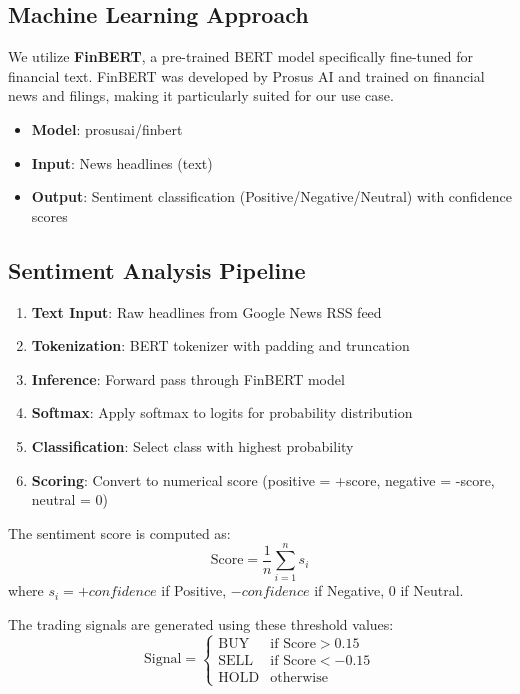 \documentclass[12pt]{article}
\begin{document}
\subsection{Machine Learning Approach}

We utilize \textbf{FinBERT}, a pre-trained BERT model specifically fine-tuned for financial text. FinBERT was developed by Prosus AI and trained on financial news and filings, making it particularly suited for our use case.

\begin{itemize}
\item \textbf{Model}: prosusai/finbert
\item \textbf{Input}: News headlines (text)
\item \textbf{Output}: Sentiment classification (Positive/Negative/Neutral) with confidence scores
\end{itemize}

\subsection{Sentiment Analysis Pipeline}

\begin{enumerate}
\item \textbf{Text Input}: Raw headlines from Google News RSS feed
\item \textbf{Tokenization}: BERT tokenizer with padding and truncation
\item \textbf{Inference}: Forward pass through FinBERT model
\item \textbf{Softmax}: Apply softmax to logits for probability distribution
\item \textbf{Classification}: Select class with highest probability
\item \textbf{Scoring}: Convert to numerical score (positive = +score, negative = -score, neutral = 0)
\end{enumerate}

The sentiment score is computed as:
\begin{equation}
\text{Score} = \frac{1}{n} \sum_{i=1}^{n} s_i
\end{equation}
where $s_i = +confidence$ if Positive, $-confidence$ if Negative, $0$ if Neutral.

\vspace{\baselineskip}

The trading signals are generated using these threshold values:
\begin{equation}
\text{Signal} = 
\begin{cases}
\text{BUY} & \text{if Score} > 0.15 \\
\text{SELL} & \text{if Score} < -0.15 \\
\text{HOLD} & \text{otherwise}
\end{cases}
\end{equation}
\end{document}
